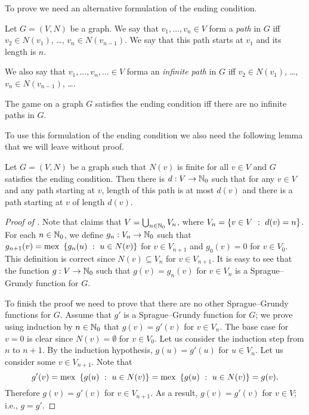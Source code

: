 To prove  we need an alternative
formulation of the ending condition. 
\begin{definition}
  Let $G = (V, N)$ be a graph. We say that $v_1, \dots, v_n \in V$ form a
  \emph{path} in $G$ iff $v_2 \in N(v_1)$, \dots, $v_n \in N(v_{n - 1})$.
  We say that this path starts at $v_1$ and its length is $n$.

  We also say that $v_1, \dots, v_n, \dots \in V$ forma an \emph{infinite path}
  in $G$ iff $v_2 \in N(v_1)$, \dots, $v_n \in N(v_{n - 1})$, \dots.
\end{definition}

\begin{remark}
  The game on a graph $G$ satisfies the ending condition iff there are no
  infinite paths in $G$.
\end{remark}

To use this formulation of the ending condition we also need the following lemma
that we will leave without proof.
\begin{lemma}[K\H{o}nig]
\label{lemma:konig}
  Let $G = (V, N)$ be a graph such that $N(v)$ is finite for all $v \in V$ and
  $G$ satisfies the ending condition. Then there is $d : V \to {\mathbb{N}}_0$ such that
  for any $v \in V$ and any path starting at $v$, length of this path is at
  most $d(v)$ and there is a path starting at $v$ of length $d(v)$.
\end{lemma}

\begin{proof}[Proof of ]
  Note that  claims that $V = \bigcup_{n \in {\mathbb{N}}_0} V_n$, where
  $V_n = \set[d(v) = n]{v \in V}$. For each $n \in {\mathbb{N}}_0$, we define 
  $g_n : V_n \to {\mathbb{N}}_0$ such that $g_{n + 1}(v) = \mex \set[u \in N(v)]{g_n(u)}$
  for $v \in V_{n + 1}$ and $g_0(v) = 0$ for $v \in V_0$. This definition is
  correct since $N(v) \subseteq V_n$ for $v \in V_{n + 1}$. It is easy to see
  that the function $g : V \to {\mathbb{N}}_0$ such that $g(v) = g_n(v)$ for $v \in V_n$
  is a Sprague--Grundy function for $G$. 

  To finish the proof we need to prove that there are no other Sprague--Grundy
  functions for $G$. Assume that $g'$ is a Sprague--Grundy function for
  $G$; we prove using induction by $n \in {\mathbb{N}}_0$ that $g(v) = g'(v)$ for 
  $v \in V_n$. The base case for $v = 0$ is clear since $N(v) = \emptyset$ for
  $v \in V_0$. Let us consider the induction step from $n$ to $n + 1$. By the
  induction hypothesis, $g(u) = g'(u)$ for $u \in V_n$. Let us consider some $v
  \in V_{n + 1}$. Note that 
  \[
    g'(v) = \mex \set[u \in N(v)]{g(u)} = \mex \set[u \in N(v)]{g(u)} = g(v).
  \]
  Therefore $g(v) = g'(v)$ for $v \in V_{n + 1}$. As a result, $g(v) = g'(v)$
  for $v \in V$; i.e., $g = g'$.
\end{proof}

